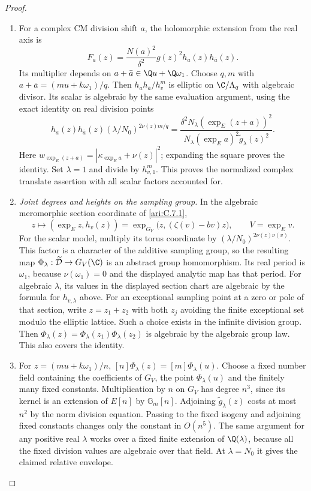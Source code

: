 \begin{proof}
\begin{enumerate}[label=\arabic*.,leftmargin=*]
\item For a complex CM division shift $a$, the holomorphic extension
from the real axis is
\[
 F_a(z)=\frac{N(a)^2}{\delta^2}g(z)^2h_a(z)h_{\bar a}(z).
\]
Its multiplier depends on $a+\bar a\in\Q u+\Q\omega_1$.
Choose $q,m$ with $a+\bar a=(mu+k\omega_1)/q$.
Then $h_ah_{\bar a}/h_v^m$ is elliptic on $\C/\Lambda_q$
with algebraic divisor. Its scalar is algebraic by the same
evaluation argument, using the exact identity on real division
points
\[
 h_a(z)h_{\bar a}(z)(\lambda/N_0)^{2\nu(z)m/q}
 =\frac{\delta^2N_\lambda(\exp_E(z+a))^2}
        {N_\lambda(\exp_Ea)^2\widetilde g_\lambda(z)^2}.
\]
Here $w_{\exp_E(z+a)}=|\kappa_{\exp_Ea}+\nu(z)|^2$;
expanding the square proves the identity. Set $\lambda=1$
and divide by $h_{v,1}^m$. This proves the normalized complex
translate assertion with all scalar factors accounted for.

\item \emph{Joint degrees and heights on the sampling group.}
In the algebraic meromorphic section coordinate of
\ref{ari:C.7.1},
\[
 z\longmapsto(\exp_Ez,h_v(z))
   =\exp_{G_V}\bigl(z,(\zeta(v)-bv)z\bigr),\qquad
 V=\exp_Ev.
\]
For the scalar model, multiply its torus coordinate by
$(\lambda/N_0)^{2\nu(z)\nu(v)}$. This factor is a character
of the additive sampling group, so the resulting map
$\Phi_\lambda:\widetilde{\mathcal D}\to G_V(\C)$ is an
abstract group homomorphism. Its real period is $\omega_1$,
because $\nu(\omega_1)=0$ and the displayed analytic map
has that period. For algebraic $\lambda$, its values in the displayed section
chart are algebraic by the formula for $h_{v,\lambda}$ above.
For an exceptional sampling point at a zero or pole of that
section, write $z=z_1+z_2$ with both $z_j$ avoiding the finite
exceptional set modulo the elliptic lattice. Such a choice exists
in the infinite division group. Then
$\Phi_\lambda(z)=\Phi_\lambda(z_1)\Phi_\lambda(z_2)$ is
algebraic by the algebraic group law. This also covers the identity.

\item For $z=(mu+k\omega_1)/n$,
$[n]\Phi_\lambda(z)=[m]\Phi_\lambda(u)$.
Choose a fixed number field containing the coefficients of
$G_V$, the point $\Phi_\lambda(u)$ and the finitely many
fixed constants. Multiplication by $n$ on $G_V$ has degree
$n^3$, since its kernel is an extension of $E[n]$ by
$\mathbb G_m[n]$. Adjoining $\widetilde g_\lambda(z)$ costs
at most $n^2$ by the norm division equation. Passing to the
fixed isogeny and adjoining fixed constants changes only the
constant in $O(n^5)$. The same argument for any positive real
$\lambda$ works over a fixed finite extension of $\Q(\lambda)$,
because all the fixed division values are algebraic over that
field. At $\lambda=N_0$ it gives the claimed relative envelope.


\end{enumerate}
\end{proof}

